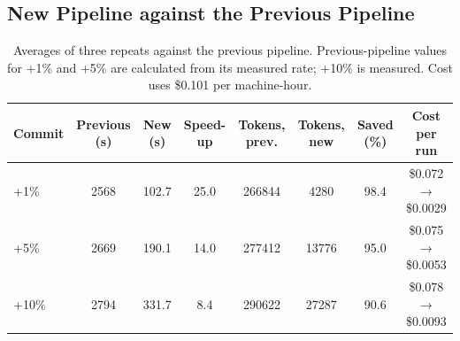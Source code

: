 \subsection{New Pipeline against the Previous Pipeline}
\begin{table}[H]
\centering
\caption[New pipeline against the previous pipeline]{Averages of three repeats against the previous pipeline.
Previous-pipeline values for +1\% and +5\% are calculated from its measured rate; +10\% is measured. Cost uses \$0.101 per
machine-hour.}
\label{tab:tmheadline}
\small\setlength{\tabcolsep}{3.5pt}
\begin{tabular}{@{}l S[table-format=4.0] S[table-format=3.1] S[table-format=2.1] S[table-format=6.0] S[table-format=5.0] S[table-format=2.1] c@{}}
\toprule
\textbf{Commit} & {\textbf{Previous (s)}} & {\textbf{New (s)}} & {\textbf{Speed-up}} & {\textbf{Tokens, prev.}} & {\textbf{Tokens, new}} & {\textbf{Saved (\%)}} & \textbf{Cost per run} \\
\midrule
+1\% & 2568 & 102.7 & 25.0 & 266844 & 4280 & 98.4 & \$0.072 $\rightarrow$ \$0.0029 \\
+5\% & 2669 & 190.1 & 14.0 & 277412 & 13776 & 95.0 & \$0.075 $\rightarrow$ \$0.0053 \\
+10\% & 2794 & 331.7 & 8.4 & 290622 & 27287 & 90.6 & \$0.078 $\rightarrow$ \$0.0093 \\
\bottomrule
\end{tabular}
\end{table}


